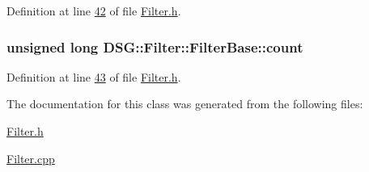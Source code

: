 Definition at line \hyperlink{_filter_8h_source_l00042}{42} of file \hyperlink{_filter_8h_source}{Filter.\+h}.

\hypertarget{class_d_s_g_1_1_filter_1_1_filter_base_a74068413169f9acb3fcf8276074e3b1d}{
\subsubsection[{count}]{\setlength{\rightskip}{0pt plus 5cm}unsigned long D\+S\+G\+::\+Filter\+::\+Filter\+Base\+::count\hspace{0.3cm}{\ttfamily [protected]}}}\label{class_d_s_g_1_1_filter_1_1_filter_base_a74068413169f9acb3fcf8276074e3b1d}


Definition at line \hyperlink{_filter_8h_source_l00043}{43} of file \hyperlink{_filter_8h_source}{Filter.\+h}.



The documentation for this class was generated from the following files\+:\begin{DoxyCompactItemize}
\item 
\hyperlink{_filter_8h}{Filter.\+h}\item 
\hyperlink{_filter_8cpp}{Filter.\+cpp}\end{DoxyCompactItemize}
